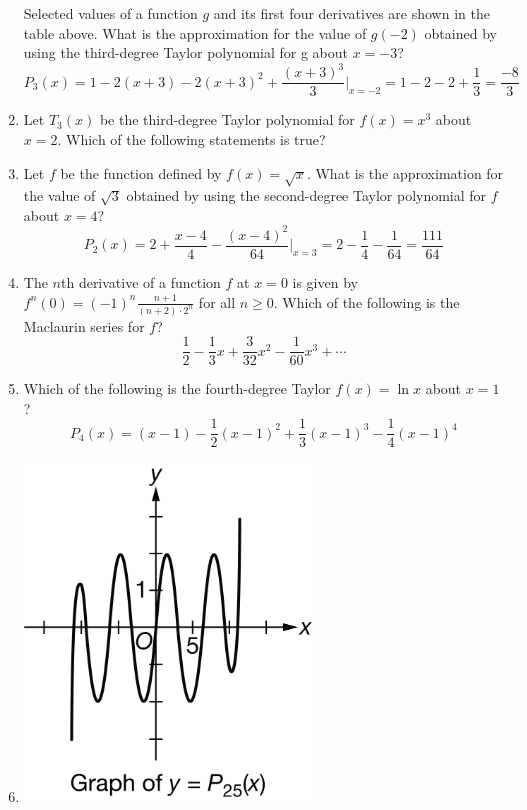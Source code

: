 \documentclass[12pt]{article}
\begin{document}
\begin{enumerate}
	      Selected values of a function $g$ and its first four derivatives are shown in the table above. What is the approximation for the value of $g(-2)$ obtained by using the third-degree Taylor polynomial for g
	      about $x=-3$?
	      $$P_3(x) = 1-2(x+3)-2(x+3)^2 + \frac{(x+3)^3}{3}\biggr\rvert_{x=-2} = 1-2-2+\frac{1}{3} = \boxed{\frac{-8}{3}}$$
	          
	\item Let $T_{3}(x)$ be the third-degree Taylor polynomial for $f(x)=x^3$ about $x=2$. Which of the following statements is true?
	      \begin{center}
	      \end{center}
	\item Let $f$ be the function defined by $f(x)=\sqrt{x}$. What is the approximation for the value of $\sqrt{3}$ obtained by using the second-degree Taylor polynomial for $f$ about $x=4$?
	      $$P_2(x) = 2+ \frac{x-4}{4} - \frac{(x-4)^2}{64}\biggr\rvert_{x=3} = 2 - \frac{1}{4} - \frac{1}{64} = \boxed{\frac{111}{64}}$$
	\item The $n$th derivative of a function $f$ at $x=0$ is given by $f^{n}(0)=(-1)^{n} \frac{n+1}{(n+2)\cdot 2^{n}}$ for all $n\geq0$. Which of the following is the Maclaurin series for $f$?
	      $$\boxed{\frac{1}{2}-\frac{1}{3}x + \frac{3}{32}x^2 - \frac{1}{60}x^3 + \cdots}$$
	\item Which of the following is the fourth-degree Taylor $f(x) = \ln x$ about $x=1$?
	      $$\boxed{P_4(x)=(x-1)-\frac{1}{2}(x-1)^2+\frac{1}{3}(x-1)^3-\frac{1}{4}(x-1)^4}$$
	\item
	      \begin{center}
	      	\includegraphics*[width = 3in]{10.11.01.png}

\end{center}
\end{enumerate}
\end{document}
